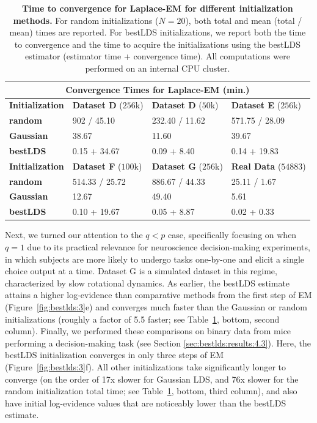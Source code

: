 \begin{table}[t!]
\setlength{\tabcolsep}{5pt}
\centering
\caption[Time to convergence for Laplace-EM for different initialization methods]{\textbf{Time to convergence for Laplace-EM for different initialization methods.} For random initializations ($N=20$), both total and mean (total / mean) times are reported. For bestLDS initializations, we report both the time to convergence and the time to acquire the initializations using the bestLDS estimator (estimator time + convergence time). All computations were performed on an internal CPU cluster.}
\vspace{0.2cm}
 \begin{tabular}{|p{2.7cm}||p{3.5cm}|p{3.5cm}|p{3.5cm}|}
 \hline
 \multicolumn{4}{|c|}{\textbf{Convergence Times for Laplace-EM} (min.) } \\
 \hline
 \textbf{Initialization} & \textbf{Dataset D} ($256$k) & \textbf{Dataset D} ($50$k) & \textbf{Dataset E} ($256$k) \\ 
 \hline
 \textbf{random} &   902 / 45.10  & 232.40 / 11.62   & 571.75 / 28.09  \\
 \textbf{Gaussian} &   38.67  & 11.60  & 39.67 \\
 \textbf{bestLDS}    & 0.15 + 34.67 & 0.09 + 8.40 &  0.14 + 19.83  \\
 \hline
 \textbf{Initialization} & \textbf{Dataset F} ($100$k) & \textbf{Dataset G} ($256$k) & \textbf{Real Data} ($54883$) \\ 
 \hline
 \textbf{random} &   514.33 / 25.72  & 886.67 / 44.33   & 25.11 / 1.67 \\
 \textbf{Gaussian} &   12.67  & 49.40  & 5.61  \\
 \textbf{bestLDS}    & 0.10 + 19.67 & 0.05 + 8.87 &  0.02 + 0.33  \\
 \hline
\end{tabular}
\label{table:bestlds:2}
\end{table}

Next, we turned our attention to the $q < p$ case, specifically focusing on when $q = 1$ due to its practical relevance for neuroscience decision-making experiments, in which subjects are more likely to undergo tasks one-by-one and elicit a single choice output at a time. Dataset G is a simulated dataset in this regime, characterized by slow rotational dynamics. As earlier, the bestLDS estimate attains a higher log-evidence than comparative methods from the first step of EM (Figure~\ref{fig:bestlds:3}e) and converges much faster than the Gaussian or random initializations (roughly a factor of 5.5 faster; see Table~\ref{table:bestlds:2}, bottom, second column). Finally, we performed these comparisons on binary data from mice performing a decision-making task (see Section \ref{sec:bestlds:results:4.3}). Here, the bestLDS initialization converges in only three steps of EM (Figure~\ref{fig:bestlds:3}f). All other initializations take significantly longer to converge (on the order of 17x slower for Gaussian LDS, and 76x slower for the random initialization total time; see Table~\ref{table:bestlds:2}, bottom, third column), and also have initial log-evidence values that are noticeably lower than the bestLDS estimate.
